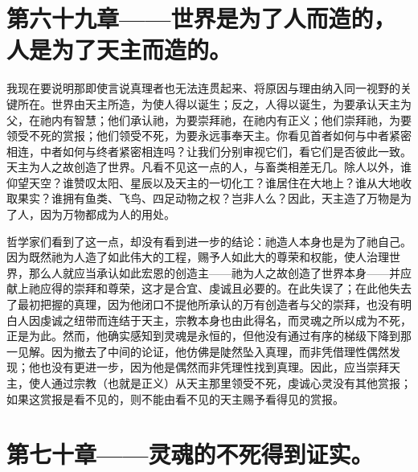 
\section{第六十九章——世界是为了人而造的，人是为了天主而造的。}

我现在要说明那即使言说真理者也无法连贯起来、将原因与理由纳入同一视野的关键所在。世界由天主所造，为使人得以诞生；反之，人得以诞生，为要承认天主为父，在祂内有智慧；他们承认祂，为要崇拜祂，在祂内有正义；他们崇拜祂，为要领受不死的赏报；他们领受不死，为要永远事奉天主。你看见首者如何与中者紧密相连，中者如何与终者紧密相连吗？让我们分别审视它们，看它们是否彼此一致。天主为人之故创造了世界。凡看不见这一点的人，与畜类相差无几。除人以外，谁仰望天空？谁赞叹太阳、星辰以及天主的一切化工？谁居住在大地上？谁从大地收取果实？谁拥有鱼类、飞鸟、四足动物之权？岂非人么？因此，天主造了万物是为了人，因为万物都成为人的用处。\par

哲学家们看到了这一点，却没有看到进一步的结论：祂造人本身也是为了祂自己。因为既然祂为人造了如此伟大的工程，赐予人如此大的尊荣和权能，使人治理世界，那么人就应当承认如此宏恩的创造主——祂为人之故创造了世界本身——并应献上祂应得的崇拜和尊荣，这才是合宜、虔诚且必要的。在此失误了；在此他失去了最初把握的真理，因为他闭口不提他所承认的万有创造者与父的崇拜，也没有明白人因虔诚之纽带而连结于天主，宗教本身也由此得名，而灵魂之所以成为不死，正是为此。然而，他确实感知到灵魂是永恒的，但他没有通过有序的梯级下降到那一见解。因为撤去了中间的论证，他仿佛是陡然坠入真理，而非凭借理性偶然发现；他也没有更进一步，因为他是偶然而非凭理性找到真理。因此，应当崇拜天主，使人通过宗教（也就是正义）从天主那里领受不死，虔诚心灵没有其他赏报；如果这赏报是看不见的，则不能由看不见的天主赐予看得见的赏报。\par


\section{第七十章——灵魂的不死得到证实。}

